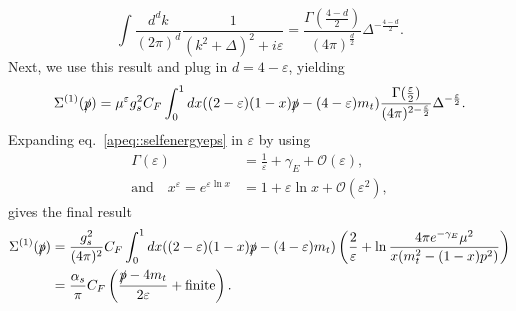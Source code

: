 \documentclass[a4paper,12pt]{book}
\begin{document}
\begin{appendices}
\begin{equation}
\int \frac{d^dk}{(2\pi)^d} \frac{1}{(k^2+\Delta)^2+i\varepsilon} = \frac{\Gamma(\frac{4-d}{2})}{(4\pi)^{\frac{d}{2}}} \Delta^{-\frac{4-d}{2}}.
\end{equation}
Next, we use this result and plug in $d=4-\varepsilon$, yielding
\begin{equation}
\label{apeq::selfenergyeps}
\Sigma^{(1)}(\slashed{p})= \mu^{\varepsilon}g_s^2 C_F \int^1_0 dx ((2-\varepsilon)(1-x)\slashed{p}-(4-\varepsilon) m_t) \frac{\Gamma(\frac{\varepsilon}{2})}{(4\pi)^{2-\frac{\varepsilon}{2}}} \Delta^{-\frac{\varepsilon}{2}}.
\end{equation}
Expanding eq.\ \eqref{apeq::selfenergyeps} in $\varepsilon$ by using 
\begin{align}
\Gamma(\varepsilon) &= \frac{1}{\varepsilon} + \gamma_E +\mathcal{O}(\varepsilon),\\
\text{and} \quad x^\varepsilon = e^{\varepsilon \ln x} &= 1+ \varepsilon \ln x +\mathcal{O}(\varepsilon^2),
\end{align}
gives the final result
\begin{align}
\Sigma^{(1)}(\slashed{p}) &= \frac{g_s^2}{(4\pi)^2} C_F \int^1_0 dx ((2-\varepsilon)(1-x)\slashed{p}-(4-\varepsilon) m_t) \left(\frac{2}{\varepsilon}+\ln \frac{4\pi e^{-\gamma_E}\mu^2}{x(m_t^2-(1-x)p^2)}\right)\\
&= \frac{\alpha_s}{\pi}C_F \left(\frac{\slashed{p}-4m_t}{2\varepsilon}+\text{finite}\right).
\end{align}
\clearpage

\end{appendices}
\end{document}
